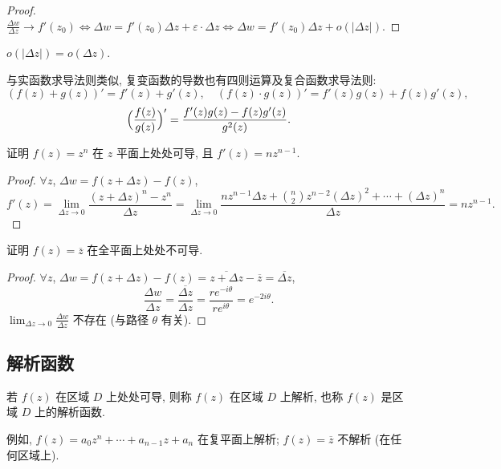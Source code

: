 \documentclass[theorem=false,mathfont=none,openany,sub3section]{easybook}
\begin{document}
\begin{proof}
  $\frac{\Delta w}{\Delta z}\to f'(z_{0})
  \Leftrightarrow \Delta w=f'(z_{0})\Delta z+\varepsilon\cdot\Delta z
  \Leftrightarrow \Delta w=f'(z_{0})\Delta z+o(|\Delta z|)$.
\end{proof}

\begin{remark}
  $o(|\Delta z|)=o(\Delta z)$.
\end{remark}

与实函数求导法则类似, 复变函数的导数也有四则运算及复合函数求导法则:
\[
(f(z)+g(z))'=f'(z)+g'(z),\quad
(f(z)\cdot g(z))'=f'(z)g(z)+f(z)g'(z),
\]
\[
\Bigl(\frac{f(z)}{g(z)}\Bigr)'=\frac{f'(z)g(z)-f(z)g'(z)}{g^{2}(z)}.
\]


\begin{example}
  证明 $f(z)=z^{n}$ 在 $z$ 平面上处处可导, 且 $f'(z)=nz^{n-1}$.\par
  \begin{proof}
    $\forall z$, $\Delta w=f(z+\Delta z)-f(z)$,
    \[
    f'(z)=\lim_{\Delta z\to0}\frac{(z+\Delta z)^{n}-z^{n}}{\Delta z}
    =\lim_{\Delta z\to0}\frac{nz^{n-1}\Delta z+\binom{n}{2}z^{n-2}(\Delta z)^{2}+\cdots+(\Delta z)^{n}}{\Delta z}=nz^{n-1}.
    \]
  \end{proof}
\end{example}

\begin{example}
  证明 $f(z)=\overline{z}$ 在全平面上处处不可导.\par
  \begin{proof}
    $\forall z$, $\Delta w=f(z+\Delta z)-f(z)=\overline{z+\Delta z}-\overline{z}=\overline{\Delta z}$,
    \[
    \frac{\Delta w}{\Delta z}=\frac{\overline{\Delta z}}{\Delta z}
    =\frac{re^{-i\theta}}{re^{i\theta}}=e^{-2i\theta}.
    \]
    $\lim_{\Delta z\to0}\frac{\Delta w}{\Delta z}$ 不存在 (与路径 $\theta$ 有关).
  \end{proof}
\end{example}

\subsection{解析函数}

\begin{definition}
  若 $f(z)$ 在区域 $D$ 上处处可导, 则称 $f(z)$ 在区域 $D$ 上解析, 也称 $f(z)$ 是区域 $D$ 上的解析函数.\par
  例如, $f(z)=a_{0}z^{n}+\cdots+a_{n-1}z+a_{n}$ 在复平面上解析; $f(z)=\overline{z}$ 不解析 (在任何区域上).
\end{definition}
\end{document}
